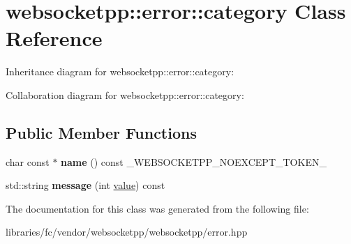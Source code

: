 \hypertarget{classwebsocketpp_1_1error_1_1category}{}\section{websocketpp\+:\+:error\+:\+:category Class Reference}
\label{classwebsocketpp_1_1error_1_1category}


Inheritance diagram for websocketpp\+:\+:error\+:\+:category\+:


Collaboration diagram for websocketpp\+:\+:error\+:\+:category\+:
\subsection*{Public Member Functions}
\begin{DoxyCompactItemize}
\item 
\mbox{\label{classwebsocketpp_1_1error_1_1category_a3643effd7e637693fa04394d43c04621}} 
char const  $\ast$ {\bfseries name} () const \+\_\+\+W\+E\+B\+S\+O\+C\+K\+E\+T\+P\+P\+\_\+\+N\+O\+E\+X\+C\+E\+P\+T\+\_\+\+T\+O\+K\+E\+N\+\_\+
\item 
\mbox{\label{classwebsocketpp_1_1error_1_1category_a92dff0e7645808ef0607f9f4fa07acbb}} 
std\+::string {\bfseries message} (int \mbox{\hyperlink{namespacewebsocketpp_1_1error_a0558d884e44e79146ad4947aea63f68d}{value}}) const
\end{DoxyCompactItemize}


The documentation for this class was generated from the following file\+:\begin{DoxyCompactItemize}
\item 
libraries/fc/vendor/websocketpp/websocketpp/error.\+hpp\end{DoxyCompactItemize}

